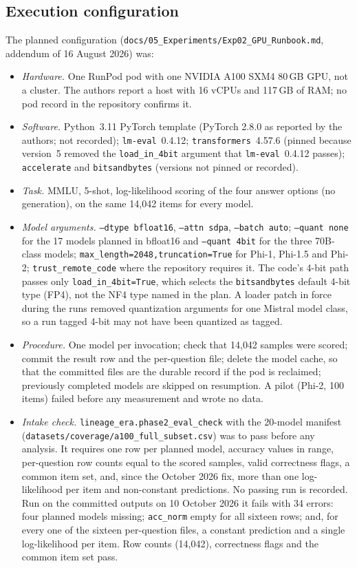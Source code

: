 \documentclass[10pt]{article}
\begin{document}
\subsection*{Execution configuration}
The planned configuration (\texttt{docs/05\_Experiments/Exp02\_GPU\_Runbook.md}, addendum of 16 August 2026) was:
\begin{itemize}
\item \emph{Hardware.} One RunPod pod with one NVIDIA A100 SXM4 80\,GB GPU, not a cluster. The authors report a host with 16 vCPUs and 117\,GB of RAM; no pod record in the repository confirms it.
\item \emph{Software.} Python~3.11 PyTorch template (PyTorch 2.8.0 as reported by the authors; not recorded); \texttt{lm-eval}~0.4.12; \texttt{transformers}~4.57.6 (pinned because version~5 removed the \texttt{load\_in\_4bit} argument that \texttt{lm-eval}~0.4.12 passes); \texttt{accelerate} and \texttt{bitsandbytes} (versions not pinned or recorded).
\item \emph{Task.} MMLU, 5-shot, log-likelihood scoring of the four answer options (no generation), on the same 14{,}042 items for every model.
\item \emph{Model arguments.} \texttt{--dtype bfloat16}, \texttt{--attn sdpa}, \texttt{--batch auto}; \texttt{--quant none} for the 17 models planned in bfloat16 and \texttt{--quant 4bit} for the three 70B-class models; \texttt{max\_length=2048,truncation=True} for Phi-1, Phi-1.5 and Phi-2; \texttt{trust\_remote\_code} where the repository requires it. The code's 4-bit path passes only \texttt{load\_in\_4bit=True}, which selects the \texttt{bitsandbytes} default 4-bit type (FP4), not the NF4 type named in the plan. A loader patch in force during the runs removed quantization arguments for one Mistral model class, so a run tagged 4-bit may not have been quantized as tagged.
\item \emph{Procedure.} One model per invocation; check that 14{,}042 samples were scored; commit the result row and the per-question file; delete the model cache, so that the committed files are the durable record if the pod is reclaimed; previously completed models are skipped on resumption. A pilot (Phi-2, 100 items) failed before any measurement and wrote no data.
\item \emph{Intake check.} \texttt{lineage\_era.phase2\_eval\_check} with the 20-model manifest (\texttt{datasets/coverage/a100\_full\_subset.csv}) was to pass before any analysis. It requires one row per planned model, accuracy values in range, per-question row counts equal to the scored samples, valid correctness flags, a common item set, and, since the October 2026 fix, more than one log-likelihood per item and non-constant predictions. No passing run is recorded. Run on the committed outputs on 10 October 2026 it fails with 34 errors: four planned models missing; \texttt{acc\_norm} empty for all sixteen rows; and, for every one of the sixteen per-question files, a constant prediction and a single log-likelihood per item. Row counts (14{,}042), correctness flags and the common item set pass.
\end{itemize}
\end{document}
